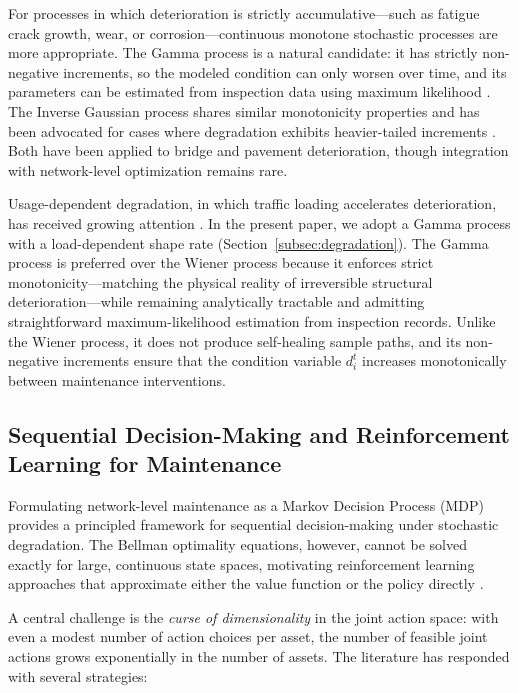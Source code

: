 \documentclass[3p, twocolumn]{elsarticle}
\begin{document}
For processes in which deterioration is strictly accumulative---such as fatigue crack growth, wear, or corrosion---continuous monotone stochastic processes are more appropriate. The Gamma process is a natural candidate: it has strictly non-negative increments, so the modeled condition can only worsen over time, and its parameters can be estimated from inspection data using maximum likelihood \citep{wangConstructionOptimizationClosed2021}. The Inverse Gaussian process shares similar monotonicity properties and has been advocated for cases where degradation exhibits heavier-tailed increments \citep{ye_inverse_2014}. Both have been applied to bridge and pavement deterioration, though integration with network-level optimization remains rare.

Usage-dependent degradation, in which traffic loading accelerates deterioration, has received growing attention \citep{van_noortwijk_survey_2009}. In the present paper, we adopt a Gamma process with a load-dependent shape rate (Section~\ref{subsec:degradation}). The Gamma process is preferred over the Wiener process because it enforces strict monotonicity---matching the physical reality of irreversible structural deterioration---while remaining analytically tractable and admitting straightforward maximum-likelihood estimation from inspection records. Unlike the Wiener process, it does not produce self-healing sample paths, and its non-negative increments ensure that the condition variable $d_i^t$ increases monotonically between maintenance interventions.

\subsection{Sequential Decision-Making and Reinforcement Learning for Maintenance}

Formulating network-level maintenance as a Markov Decision Process (MDP) provides a principled framework for sequential decision-making under stochastic degradation. The Bellman optimality equations, however, cannot be solved exactly for large, continuous state spaces, motivating reinforcement learning approaches that approximate either the value function or the policy directly \citep{andriotis_managing_2019}.

A central challenge is the \emph{curse of dimensionality} in the joint action space: with even a modest number of action choices per asset, the number of feasible joint actions grows exponentially in the number of assets. The literature has responded with several strategies:
\end{document}
